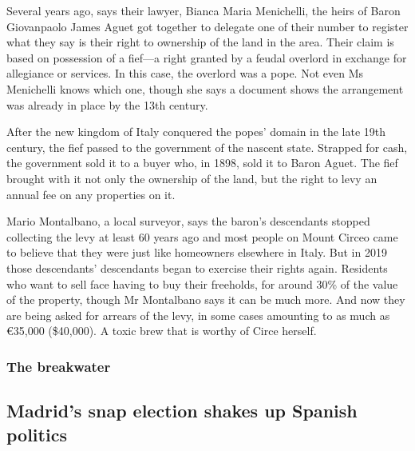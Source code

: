 \documentclass{article}
\begin{document}
Several years ago, says their lawyer, Bianca Maria Menichelli, the heirs of Baron Giovanpaolo James Aguet got together to delegate one of their number to register what they say is their right to ownership of the land in the area. Their claim is based on possession of a fief---a right granted by a feudal overlord in exchange for allegiance or services. In this case, the overlord was a pope. Not even Ms Menichelli knows which one, though she says a document shows the arrangement was already in place by the 13th century. 

After the new kingdom of Italy conquered the popes' domain in the late 19th century, the fief passed to the government of the nascent state. Strapped for cash, the government sold it to a buyer who, in 1898, sold it to Baron Aguet. The fief brought with it not only the ownership of the land, but the right to levy an annual fee on any properties on it. 

Mario Montalbano, a local surveyor, says the baron's descendants stopped collecting the levy at least 60 years ago and most people on Mount Circeo came to believe that they were just like homeowners elsewhere in Italy. But in 2019 those descendants' descendants began to exercise their rights again. Residents who want to sell face having to buy their freeholds, for around 30\% of the value of the property, though Mr Montalbano says it can be much more. And now they are being asked for arrears of the levy, in some cases amounting to as much as €35,000 (\$40,000). A toxic brew that is worthy of Circe herself. 
\clearpage
\subsubsection{The breakwater }
\subsection{Madrid's snap election shakes up Spanish politics }
\end{document}
